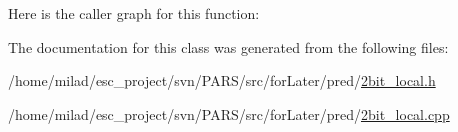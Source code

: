 Here is the caller graph for this function:




The documentation for this class was generated from the following files:\begin{DoxyCompactItemize}
\item 
/home/milad/esc\_\-project/svn/PARS/src/forLater/pred/\hyperlink{2bit__local_8h}{2bit\_\-local.h}\item 
/home/milad/esc\_\-project/svn/PARS/src/forLater/pred/\hyperlink{2bit__local_8cpp}{2bit\_\-local.cpp}\end{DoxyCompactItemize}
